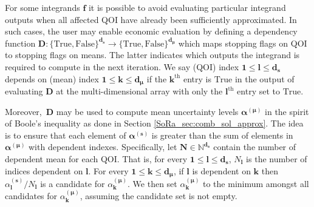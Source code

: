 \documentclass[graybox]{svmult}
\begin{document}
For some integrands $\boldsymbol{f}$ it is possible to avoid evaluating particular integrand outputs when all affected QOI have already been sufficiently approximated. In such cases, the user may enable economic evaluation by defining a dependency function $\boldsymbol{D}: \{\text{True},\text{False}\}^{\boldsymbol{d}_{\boldsymbol{s}}} \to \{\text{True},\text{False}\}^{\boldsymbol{d}_{\boldsymbol{\mu}}}$ which maps stopping flags on QOI to stopping flags on means. The latter indicates which outputs the integrand is required to compute in the next iteration.  We say (QOI) index $\boldsymbol{1} \leq \boldsymbol{l} \leq \boldsymbol{d}_{\boldsymbol{s}}$ depends on (mean) index $\boldsymbol{1} \leq \boldsymbol{k} \leq \boldsymbol{d}_{\boldsymbol{\mu}}$ if the $\boldsymbol{k}^\text{th}$ entry is $\text{True}$ in the output of evaluating $\boldsymbol{D}$ at the multi-dimensional array with only the $\boldsymbol{l}^\text{th}$ entry set to $\text{True}$.

Moreover, $\,\boldsymbol{D}$ may be used to compute mean uncertainty levels $\boldsymbol{\alpha}^{(\boldsymbol{\mu})}$ in the spirit of Boole's inequality as done in Section \ref{SoRa_sec:comb_sol_approx}. The idea is to ensure that each element of $\boldsymbol{\alpha}^{(\boldsymbol{s})}$ is greater than the sum of elements in $\boldsymbol{\alpha}^{(\boldsymbol{\mu})}$ with dependent indexes. Specifically, let $\boldsymbol{N} \in \mathbb{N}^{\boldsymbol{d}_{\boldsymbol{s}}}$ contain the number of dependent mean for each QOI. That is, for every $\boldsymbol{1} \leq \boldsymbol{l} \leq \boldsymbol{d}_{\boldsymbol{s}}$, $N_{\boldsymbol{l}}$ is the number of indices dependent on $\boldsymbol{l}$. For every $\boldsymbol{1} \leq \boldsymbol{k} \leq \boldsymbol{d}_{\boldsymbol{\mu}}$, if $\boldsymbol{l}$ is dependent on $\boldsymbol{k}$ then $\alpha_{\boldsymbol{l}}^{(\boldsymbol{s})}/N_{\boldsymbol{l}}$ is a candidate for $\alpha_{\boldsymbol{k}}^{(\boldsymbol{\mu})}$. We then set $\alpha_{\boldsymbol{k}}^{(\boldsymbol{\mu})}$ to the minimum amongst all candidates for $\alpha_{\boldsymbol{k}}^{(\boldsymbol{\mu})}$, assuming the candidate set is not empty.
\end{document}

